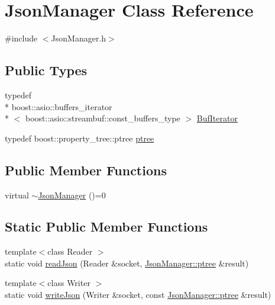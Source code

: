 \hypertarget{class_json_manager}{\section{Json\+Manager Class Reference}
\label{class_json_manager}
}


{\ttfamily \#include $<$Json\+Manager.\+h$>$}

\subsection*{Public Types}
\begin{DoxyCompactItemize}
\item 
typedef \\*
boost\+::asio\+::buffers\+\_\+iterator\\*
$<$ boost\+::asio\+::streambuf\+::const\+\_\+buffers\+\_\+type $>$ \hyperlink{class_json_manager_a8f05d70930bca17dbe59e4a208398816}{Buf\+Iterator}
\item 
typedef boost\+::property\+\_\+tree\+::ptree \hyperlink{class_json_manager_a76d597238ac2bb690fe24acce5a3b78b}{ptree}
\end{DoxyCompactItemize}
\subsection*{Public Member Functions}
\begin{DoxyCompactItemize}
\item 
virtual \hyperlink{class_json_manager_a4d64ef1d012b8cd3af58e061b5643335}{$\sim$\+Json\+Manager} ()=0
\end{DoxyCompactItemize}
\subsection*{Static Public Member Functions}
\begin{DoxyCompactItemize}
\item 
{\footnotesize template$<$class Reader $>$ }\\static void \hyperlink{class_json_manager_a122b69a25e15dd7ab5bdc9ee84ca808b}{read\+Json} (Reader \&socket, \hyperlink{class_json_manager_a76d597238ac2bb690fe24acce5a3b78b}{Json\+Manager\+::ptree} \&result)
\item 
{\footnotesize template$<$class Writer $>$ }\\static void \hyperlink{class_json_manager_a7f80eb86717ae871369306c63baba9f1}{write\+Json} (Writer \&socket, const \hyperlink{class_json_manager_a76d597238ac2bb690fe24acce5a3b78b}{Json\+Manager\+::ptree} \&result)
\end{DoxyCompactItemize}


